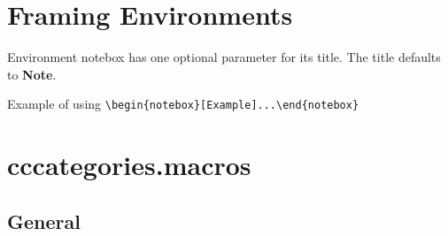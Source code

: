 \documentclass[10pt,a4paper]{article}
\begin{document}
\section{Framing Environments}

\begin{notebox}
Environment notebox has one optional parameter for its title. The title defaults to \textbf {Note}.
\end{notebox}

\begin{notebox}[Example]
Example of using \verb!\begin{notebox}[Example]...\end{notebox}!
\end{notebox}


\section {cccategories.macros }
\vspace{5mm}
\subsection{General}
\end{document}
